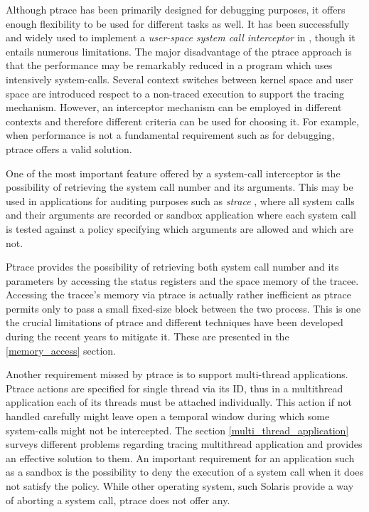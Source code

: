 Although ptrace has been primarily designed for debugging purposes, it offers enough flexibility to be used for different tasks as well. It has been successfully and widely used to implement a \emph{user-space system call interceptor} in \cite{Provos02improvinghost,Janus,MapBox, Noordende_asecure, Jain99user-levelinfrastructure}, though it entails numerous limitations. The major disadvantage of the ptrace approach is that the performance may be remarkably reduced in a program which uses intensively system-calls. Several context switches between kernel space and user space are introduced respect to a non-traced execution to support the tracing mechanism. However, an interceptor mechanism can be employed in different contexts and therefore different criteria can be used for choosing it. For example, when performance is not a fundamental requirement such as for debugging, ptrace offers a valid solution. 

One of the most important feature offered by a system-call interceptor is the possibility of retrieving the system call number and its arguments. This may be used in applications for auditing purposes such as \emph{strace} \cite{strace}, where all system calls and their arguments are recorded or sandbox application \cite{Provos02improvinghost,Janus} where each system call is tested against a policy specifying which arguments are allowed and which are not.

Ptrace provides the possibility of retrieving both system call number and its parameters by accessing the status registers and the space memory of the tracee. Accessing the tracee's memory via ptrace is actually rather inefficient as ptrace permits only to pass a small fixed-size block  between the two process. This is one the crucial limitations of ptrace and different techniques have been developed during the recent years to mitigate it. These are presented in the \ref{memory_access} section. 


Another requirement missed by ptrace is to support multi-thread applications. Ptrace actions are specified for single thread via its ID, thus in a multithread application each of its threads must be attached individually. This action if not handled carefully might leave open a temporal window during which some system-calls might not be intercepted. The section  \ref{multi_thread_application} surveys different problems regarding tracing multithread application and provides an effective solution to them.
An important requirement for an application such as a sandbox is the possibility to deny the execution of a system call when it does not satisfy the policy. While other operating system, such Solaris provide a way of aborting a system call, ptrace does not offer any.  

